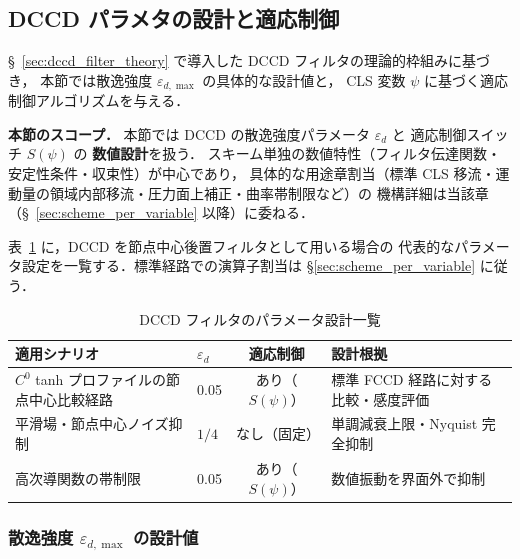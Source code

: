 \subsection{DCCD パラメタの設計と適応制御}
\label{sec:dccd_params}

§~\ref{sec:dccd_filter_theory} で導入した DCCD フィルタの理論的枠組みに基づき，
本節では散逸強度 $\varepsilon_{d,\max}$ の具体的な設計値と，
CLS 変数 $\psi$ に基づく適応制御アルゴリズムを与える．

\noindent\textbf{本節のスコープ．}
本節では DCCD の散逸強度パラメータ $\varepsilon_d$ と
適応制御スイッチ $S(\psi)$ の \textbf{数値設計}を扱う．
スキーム単独の数値特性（フィルタ伝達関数・安定性条件・収束性）が中心であり，
具体的な用途章割当（標準 CLS 移流・運動量の領域内部移流・圧力面上補正・曲率帯制限など）の
機構詳細は当該章（§~\ref{sec:scheme_per_variable} 以降）に委ねる．

表~\ref{tab:dccd_usage_map} に，DCCD を節点中心後置フィルタとして用いる場合の
代表的なパラメータ設定を一覧する．標準経路での演算子割当は
§\ref{sec:scheme_per_variable} に従う．

\begin{table}[htbp]
\centering
\caption{DCCD フィルタのパラメータ設計一覧}
\label{tab:dccd_usage_map}
\small
\begin{tabular}{llcl}
\hline
適用シナリオ & $\varepsilon_d$ & 適応制御 & 設計根拠 \\
\hline
$C^0$ tanh プロファイルの節点中心比較経路
  & 0.05 & あり（$S(\psi)$） & 標準 FCCD 経路に対する比較・感度評価 \\
平滑場・節点中心ノイズ抑制
  & $1/4$ & なし（固定） & 単調減衰上限・Nyquist 完全抑制 \\
高次導関数の帯制限
  & 0.05 & あり（$S(\psi)$） & 数値振動を界面外で抑制 \\
\hline
\end{tabular}
\end{table}

\subsubsection{散逸強度 \texorpdfstring{$\varepsilon_{d,\max}$}{ε\_d,max} の設計値}
\label{sec:dccd_eps_design}

